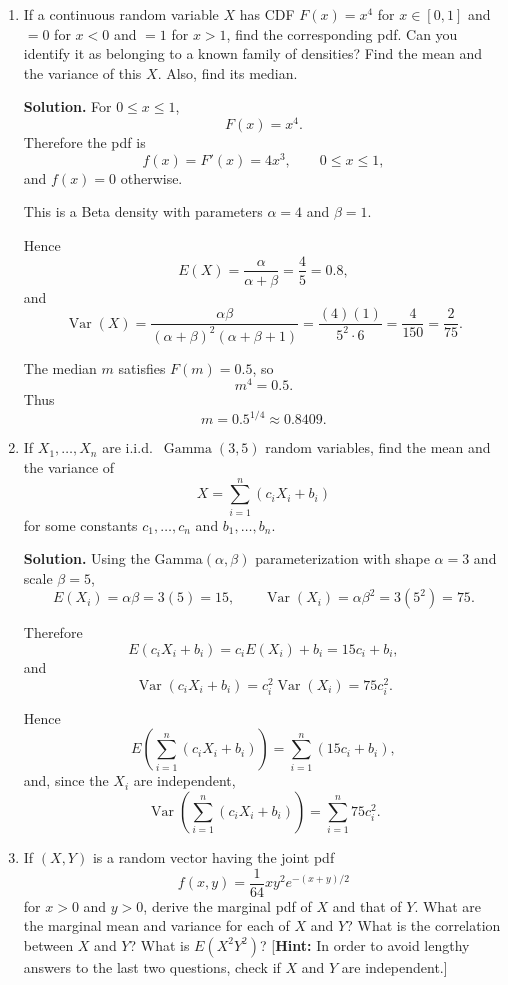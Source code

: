 \documentclass[12pt]{article}
\begin{document}
\begin{enumerate}[label=(\arabic*), leftmargin=*]
\begin{enumerate}[label=(\alph*), itemsep=0.5em]
    \item \textbf{False.} For $a\neq 0$ and $c\neq 0$,
    \[
    \operatorname{Corr}(aX+b,cY+d)=\frac{ac}{|ac|}\operatorname{Corr}(X,Y)=\operatorname{sign}(ac)\,r,
    \]
    not $acr+bd$.
\end{enumerate}

\item If a continuous random variable $X$ has CDF $F(x)=x^4$ for $x\in[0,1]$ and $=0$ for $x<0$ and $=1$ for $x>1$, find the corresponding pdf. Can you identify it as belonging to a known family of densities? Find the mean and the variance of this $X$. Also, find its median.

\par\medskip
\noindent\textbf{Solution.}
For $0\le x\le 1$,
\[
F(x)=x^4.
\]
Therefore the pdf is
\[
f(x)=F'(x)=4x^3,\qquad 0\le x\le 1,
\]
and $f(x)=0$ otherwise.

This is a Beta density with parameters $\alpha=4$ and $\beta=1$.

Hence
\[
E(X)=\frac{\alpha}{\alpha+\beta}=\frac{4}{5}=0.8,
\]
and
\[
\operatorname{Var}(X)=\frac{\alpha\beta}{(\alpha+\beta)^2(\alpha+\beta+1)}
=\frac{(4)(1)}{5^2\cdot 6}
=\frac{4}{150}
=\frac{2}{75}.
\]

The median $m$ satisfies $F(m)=0.5$, so
\[
m^4=0.5.
\]
Thus
\[
m=0.5^{1/4}\approx 0.8409.
\]

\item If $X_1,\ldots,X_n$ are i.i.d.\ $\operatorname{Gamma}(3,5)$ random variables, find the mean and the variance of
\[
X=\sum_{i=1}^n (c_iX_i+b_i)
\]
for some constants $c_1,\ldots,c_n$ and $b_1,\ldots,b_n$.

\par\medskip
\noindent\textbf{Solution.}
Using the Gamma$(\alpha,\beta)$ parameterization with shape $\alpha=3$ and scale $\beta=5$,
\[
E(X_i)=\alpha\beta=3(5)=15,
\qquad
\operatorname{Var}(X_i)=\alpha\beta^2=3(5^2)=75.
\]

Therefore
\[
E(c_iX_i+b_i)=c_iE(X_i)+b_i=15c_i+b_i,
\]
and
\[
\operatorname{Var}(c_iX_i+b_i)=c_i^2\operatorname{Var}(X_i)=75c_i^2.
\]

Hence
\[
E\!\left(\sum_{i=1}^n(c_iX_i+b_i)\right)=\sum_{i=1}^n(15c_i+b_i),
\]
and, since the $X_i$ are independent,
\[
\operatorname{Var}\!\left(\sum_{i=1}^n(c_iX_i+b_i)\right)=\sum_{i=1}^n 75c_i^2.
\]

\item If $(X,Y)$ is a random vector having the joint pdf
\[
f(x,y)=\frac{1}{64}xy^2e^{-(x+y)/2}
\]
for $x>0$ and $y>0$, derive the marginal pdf of $X$ and that of $Y$. What are the marginal mean and variance for each of $X$ and $Y$? What is the correlation between $X$ and $Y$? What is $E(X^2Y^2)$? [\textbf{Hint:} In order to avoid lengthy answers to the last two questions, check if $X$ and $Y$ are independent.]


\end{enumerate}
\end{document}

